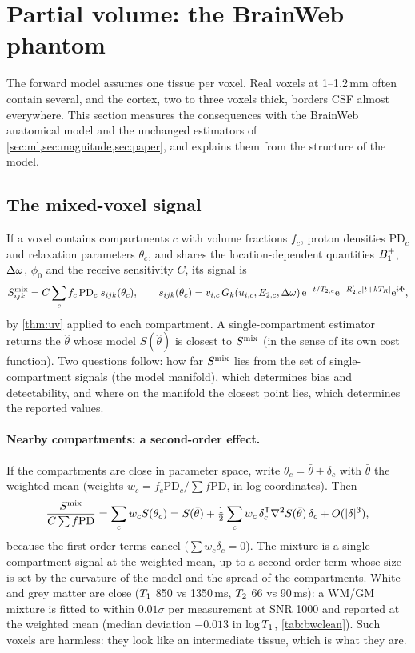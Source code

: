 \section{Partial volume: the BrainWeb phantom}\label{sec:pv}

The forward model assumes one tissue per voxel. Real voxels at 1--1.2\,mm often contain
several, and the cortex, two to three voxels thick, borders CSF almost everywhere. This
section measures the consequences with the BrainWeb anatomical model and the unchanged
estimators of \cref{sec:ml,sec:magnitude,sec:paper}, and explains them from the structure of
the model.

\subsection{The mixed-voxel signal}

If a voxel contains compartments $c$ with volume fractions $f_c$, proton densities $\mathrm{PD}_c$ and
relaxation parameters $\theta_c$, and shares the location-dependent quantities $B_1^{+}$, $\Delta\omega$, $\phi_0$
and the receive sensitivity $C$, its signal is
\begin{equation}
  S^{\rm mix}_{ijk}=C\sum_cf_c\,\mathrm{PD}_c\;s_{ijk}(\theta_c),\qquad
  s_{ijk}(\theta_c)=v_{i,c}\,G_k(u_{i,c},E_{2,c},\Delta\omega)\,\mathrm{e}^{-t/T_{2,c}}\mathrm{e}^{-R'_{2,c}|t+kT_R|}\mathrm{e}^{i\Phi},
  \label{eq:mix}
\end{equation}
by \cref{thm:uv} applied to each compartment. A single-compartment estimator returns the
$\hat\theta$ whose model $S(\hat\theta)$ is closest to $S^{\rm mix}$ (in the sense of its own cost function).
Two questions follow: how far $S^{\rm mix}$ lies from the set of single-compartment signals (the
model manifold), which determines bias and detectability, and where on the manifold the
closest point lies, which determines the reported values.

\paragraph{Nearby compartments: a second-order effect.} If the compartments are close in
parameter space, write $\theta_c=\bar\theta+\delta_c$ with $\bar\theta$ the weighted mean (weights
$w_c=f_c\mathrm{PD}_c/\sum f\mathrm{PD}$, in log coordinates). Then
\begin{equation}
  \frac{S^{\rm mix}}{C\sum f\mathrm{PD}}=\sum_cw_cS(\theta_c)
  =S(\bar\theta)+\tfrac12\sum_cw_c\,\delta_c^{\mathsf T}\nabla^2S(\bar\theta)\,\delta_c+O(|\delta|^3),
  \label{eq:mix2}
\end{equation}
because the first-order terms cancel ($\sum w_c\delta_c=0$). The mixture is a single-compartment
signal at the weighted mean, up to a second-order term whose size is set by the curvature of
the model and the spread of the compartments. White and grey matter are close
($T_1$ 850 vs 1350\,ms, $T_2$ 66 vs 90\,ms): a WM/GM mixture is fitted to within $0.01\sigma$ per
measurement at SNR 1000 and reported at the weighted mean (median deviation $-0.013$ in
$\log T_1$, \cref{tab:bwclean}). Such voxels are harmless: they look like an intermediate tissue,
which is what they are.

